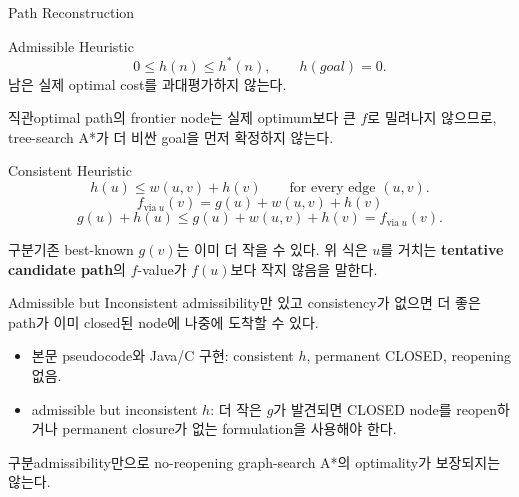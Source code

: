 \begin{frame}{Path Reconstruction}
\centering{}
\end{frame}
\begin{frame}{Admissible Heuristic}
\[
0\le h(n)\le h^*(n),\qquad h(goal)=0.
\]
남은 실제 optimal cost를 과대평가하지 않는다.
\begin{block}{직관}optimal path의 frontier node는 실제 optimum보다 큰 \(f\)로 밀려나지 않으므로, tree-search A*가 더 비싼 goal을 먼저 확정하지 않는다.\end{block}
\end{frame}
\begin{frame}{Consistent Heuristic}
\[
h(u)\le w(u,v)+h(v)\qquad\text{for every edge }(u,v).
\]
\[
f_{\mathrm{via}\ u}(v)
=g(u)+w(u,v)+h(v)
\]
\[
g(u)+h(u)
\le g(u)+w(u,v)+h(v)
=f_{\mathrm{via}\ u}(v).
\]
\begin{alertblock}{구분}기존 best-known \(g(v)\)는 이미 더 작을 수 있다. 위 식은 \(u\)를 거치는 \textbf{tentative candidate path}의 \(f\)-value가 \(f(u)\)보다 작지 않음을 말한다.\end{alertblock}
\end{frame}
\begin{frame}{Admissible but Inconsistent \hfill \ssoptional[Advanced]}
admissibility만 있고 consistency가 없으면 더 좋은 path가 이미 closed된 node에 나중에 도착할 수 있다.
\begin{itemize}
\item 본문 pseudocode와 Java/C 구현: consistent \(h\), permanent CLOSED, reopening 없음.
\item admissible but inconsistent \(h\): 더 작은 \(g\)가 발견되면 CLOSED node를 reopen하거나 permanent closure가 없는 formulation을 사용해야 한다.
\end{itemize}
\begin{alertblock}{구분}admissibility만으로 no-reopening graph-search A*의 optimality가 보장되지는 않는다.\end{alertblock}
\end{frame}
